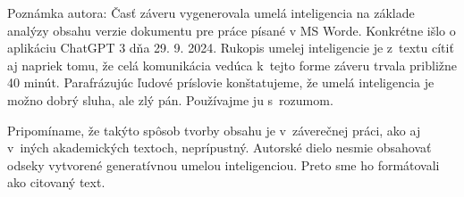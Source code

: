 Poznámka autora:
Časť záveru vygenerovala umelá inteligencia 
na základe analýzy obsahu 
verzie dokumentu pre práce písané v MS Worde.
Konkrétne išlo o aplikáciu ChatGPT 3 dňa 29. 9. 2024.
Rukopis umelej inteligencie je z~textu cítiť aj napriek tomu,
že celá komunikácia vedúca k~tejto forme záveru
trvala približne 40 minút.
Parafrázujúc ľudové príslovie konštatujeme,
že umelá inteligencia je možno dobrý sluha,
ale zlý pán.
Používajme ju s~rozumom.

Pripomíname, že takýto spôsob tvorby obsahu je
v~záverečnej práci, ako aj v~iných akademických textoch, 
neprípustný.
Autorské dielo nesmie obsahovať odseky vytvorené
generatívnou umelou inteligenciou.
Preto sme ho formátovali ako citovaný text.
